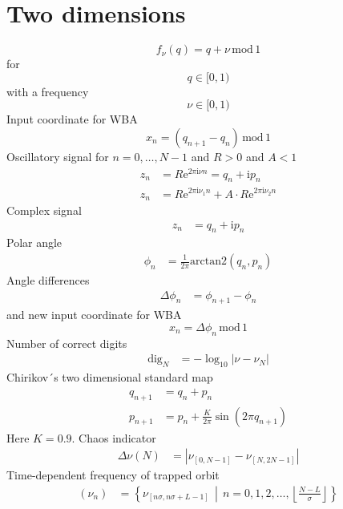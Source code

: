 \documentclass[english, parskip=full]{scrartcl}
\newcommand{\klammer}{}
\newcommand{\tecxt}{}
\def\I{\text{i}}
\def\E{\text{e}}
\begin{document}
\section{Two dimensions}
$$f_\nu(q)=q+\nu\,\tecxt\text{mod}\, 1$$ 
for 
$$q\in [0,1)$$ 
with a frequency 
$$\nu\in [0,1)$$
Input coordinate for WBA
$$x_n=(q_{n+1}-q_n)\, \tecxt\text{mod}\, 1$$
Oscillatory signal for $n=0,\dots,N-1$ and $R>0$ and $A<1$
\begin{align*}
z_n&=R\E^{2\pi\I\nu n}=q_n+\I p_n\\
z_n&=R\E^{2\pi\I\nu_1 n}+A\cdot R\E^{2\pi\I\nu_2 n}
\end{align*}
Complex signal
\begin{align*}
z_n&=q_n+\I p_n
\end{align*}
Polar angle
\begin{align*}
\phi_n&=\frac{1}{2\pi}\tecxt\text{arctan2}(q_n,p_n)
\end{align*} 
Angle differences
\begin{align*}
\Delta\phi_n&=\phi_{n+1}-\phi_n
\end{align*} 
and new input coordinate for WBA 
$$x_n=\Delta\phi_n\,\tecxt\text{mod}\,1$$
Number of correct digits
\begin{align*}
\tecxt\text{dig}_N&=-\log_{10}|\nu-\nu_N|
\end{align*}
Chirikov´s two dimensional standard map
\begin{align*} 
q_{n+1}&=q_{n}+p_{n}\\
p_{n+1}&=p_{n}+\frac{K}{2\pi}\sin (2\pi q_{n+1})
\end{align*}
Here $K=0.9$.
Chaos indicator
\begin{align*}
\Delta\nu (N) &=|\nu_{[0,N-1]}-\nu_{[N,2N-1]}|
\end{align*} 
Time-dependent frequency of trapped orbit
\begin{align*}
(\nu_n)&=\klammer\left\{\nu_{[n\sigma,n\sigma + L-1]}\,\middle\vert\,n=0,1,2,\dots,\left\lfloor\frac{N-L}{\sigma}\right\rfloor \right\}
\end{align*}
\end{document}
